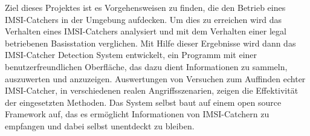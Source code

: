 Ziel dieses Projektes ist es Vorgehensweisen zu finden, die den Betrieb eines IMSI-Catchers in der Umgebung aufdecken.
Um dies zu erreichen wird das Verhalten eines IMSI-Catchers analysiert und mit dem Verhalten einer legal betriebenen Basisstation verglichen.
Mit Hilfe dieser Ergebnisse wird dann das IMSI-Catcher Detection System entwickelt, ein Programm mit einer benutzerfreundlichen Oberfl\"ache, das dazu dient Informationen zu sammeln, auszuwerten und anzuzeigen.
Auswertungen von Versuchen zum Auffinden echter IMSI-Catcher, in verschiedenen realen Angriffsszenarien, zeigen die Effektivität  der eingesetzten Methoden.
Das System selbst baut auf einem open source Framework auf, das es erm\"oglicht Informationen von IMSI-Catchern zu empfangen und dabei selbst unentdeckt zu bleiben.

